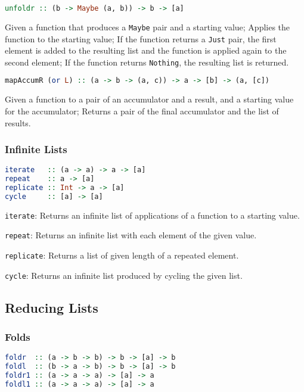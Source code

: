 \documentclass[twocolumn,english]{article}
\begin{document}
\begin{lstlisting}[language=Haskell,frame=single]
unfoldr :: (b -> Maybe (a, b)) -> b -> [a]
\end{lstlisting}


Given a function that produces a \texttt{Maybe} pair and a starting
value; Applies the function to the starting value; If the function
returns a \texttt{Just} pair, the first element is added to the resulting
list and the function is applied again to the second element; If the
function returns \texttt{Nothing}, the resulting list is returned.

\begin{lstlisting}[language=Haskell,frame=single]
mapAccumR (or L) :: (a -> b -> (a, c)) -> a -> [b] -> (a, [c])
\end{lstlisting}


Given a function to a pair of an accumulator and a result, and a starting
value for the accumulator; Returns a pair of the final accumulator
and the list of results.


\subsubsection{Infinite Lists}

\begin{lstlisting}[language=Haskell,frame=single]
iterate   :: (a -> a) -> a -> [a]
repeat    :: a -> [a]
replicate :: Int -> a -> [a]
cycle     :: [a] -> [a]
\end{lstlisting}


\texttt{iterate}: Returns an infinite list of applications of a function
to a starting value.

\texttt{repeat}: Returns an infinite list with each element of the
given value.

\texttt{replicate}: Returns a list of given length of a repeated element.

\texttt{cycle}: Returns an infinite list produced by cycling the given
list.


\subsection{Reducing Lists}


\subsubsection{Folds}

\begin{lstlisting}[language=Haskell,frame=single]
foldr  :: (a -> b -> b) -> b -> [a] -> b
foldl  :: (b -> a -> b) -> b -> [a] -> b
foldr1 :: (a -> a -> a) -> [a] -> a
foldl1 :: (a -> a -> a) -> [a] -> a
\end{lstlisting}
\end{document}
